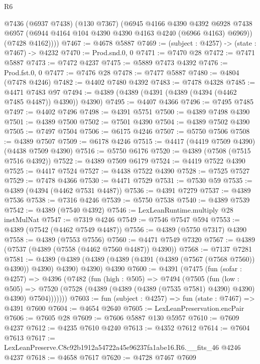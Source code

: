 \begin{lexlean}{R6}
\begin{coremodule}
        @7436
          (@6937 @7438)
          (@130 @7367)
          (@6945
            @4166
            @4390
            @4392
            @6928
            @7438
            @6957
            (@6944 @4164 @104 @4390 @4390 @4163 @4240 (@6966 @4163) @6969))
          (@7428 @4162))))
@7467 := @4678 @5887
@7469 := (subject : @4257) -> (state : @7467) -> @4232
@7470 := Prod.snd.{0, 0}
@7471 := @7470 @28
@7472 := @7471 @5887
@7473 := @7472 @4237
@7475 := @5889 @7473 @4392
@7476 := Prod.fst.{0, 0}
@7477 := @7476 @28
@7478 := @7477 @5887
@7480 := @4804 (@7478 @4246)
@7482 := @4402 @7480 @4392
@7483 := @7478 @4328
@7485 := @4471 @7483 @97
@7494 := @4389 (@4389 (@4391 (@4389 (@4394 (@4462 @7485 @4487)) @4390)) @4390)
@7495 := @4407 @4366
@7496 := @7495 @7485
@7497 := @4402 @7496
@7498 := @4391 @5751
@7500 := @4389 @7498 @4390
@7501 := @4389 @7500
@7502 := @7501 @4390
@7504 := @4389 @7502 @4390
@7505 := @7497 @7504
@7506 := @6175 @4246
@7507 := @5750 @7506
@7508 := @4389 @7507
@7509 := @6178 @4246
@7515 := @4417 (@4419 @7509 @4390) (@4438 @7509 @4390)
@7516 := @5750 @6176
@7520 := @4389 (@7508 (@7515 @7516 @4392))
@7522 := @4389 @7509 @6179
@7524 := @4419 @7522 @4390
@7525 := @4417 @7524
@7527 := @4438 @7522 @4390
@7528 := @7525 @7527
@7529 := @7478 @4366
@7530 := @4471 @7529
@7531 := @7530 @59
@7535 := @4389 (@4394 (@4462 @7531 @4487))
@7536 := @4391 @7279
@7537 := @4389 @7536
@7538 := @7316 @4246
@7539 := @5750 @7538
@7540 := @4389 @7539
@7542 := @4389 (@7540 @4392)
@7546 := LexLeanRuntime.multiply @28 instMulNat
@7547 := @7319 @4246
@7549 := @7546 @7547 @594
@7553 := @4389 (@7542 (@4462 @7549 @4487))
@7556 := @4389 (@5750 @7317) @4390
@7558 := @4389 (@7553 @7556)
@7560 := @4471 @7549 @7320
@7567 := @4389 (@7537 (@4389 (@7558 (@4462 @7560 @4487)) @4390))
@7568 := @7137 @7281
@7581 := @4389
    (@4389 (@4389 (@4389 (@4391 (@4389 (@7567 (@7568 @7560)) @4390)) @4390) @4390) @4390)
    @4390
@7600 := @4391
    (@7475
      (fun (sofar : @4257) =>
      @4396
        (@7482
          (fun (high : @505) =>
          @7494
            (@7505
              (fun (low : @505) =>
              @7520 (@7528 (@4389 (@4389 (@4389 (@7535 @7581) @4390) @4390) @4390) @7504)))))))
@7603 := fun (subject : @4257) => fun (state : @7467) => @4391 @7600
@7604 := @4654 @2640
@7605 := LexLeanPreservation.encPair
@7606 := @7605 @28
@7609 := @7606 @5887 @130 @5957
@7610 := @7609 @4237
@7612 := @4235 @7610 @4240
@7613 := @4352 @7612
@7614 := @7604 @7613
@7617 := LexLeanPreserve.C8c92b1912a54722a45e96237fa1abe16.R6.__fits_46 @4246 @4237
@7618 := @4658 @7617
@7620 := @4728 @7467 @7609

\end{coremodule}
\end{lexlean}
